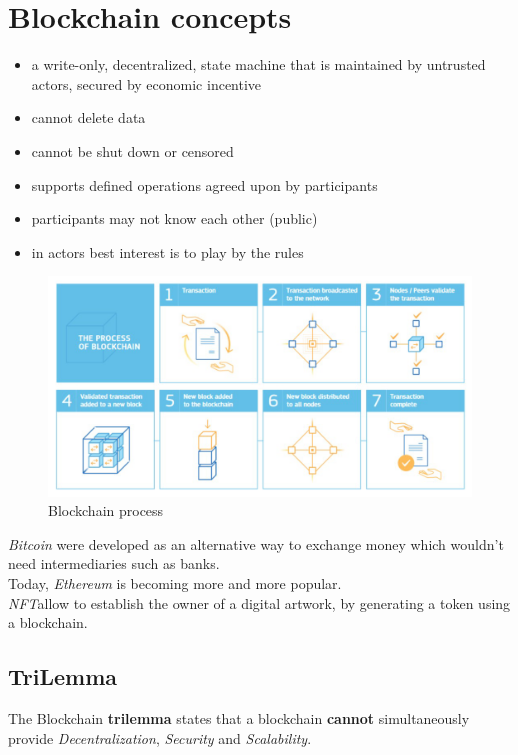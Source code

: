 \section{Blockchain concepts}
\begin{definition}[Blockchain]
\begin{itemize}
   \item a write-only, decentralized, state machine that is maintained by untrusted
   actors, secured by economic incentive
   \item cannot delete data
   \item cannot be shut down or censored
   \item supports defined operations agreed upon by participants
   \item participants may not know each other (public)
   \item in actors best interest is to play by the rules
\end{itemize}
\end{definition}
\begin{figure}[htbp]
   \centering
   \includegraphics{images/blockchain_process.png}
   \caption{Blockchain process}
   \label{fig:blockchain_process}
\end{figure}

\textit{Bitcoin} were developed as an alternative way to exchange money which wouldn't need intermediaries such as banks.\\
Today, \textit{Ethereum} is becoming more and more popular.\\
\textit{NFT}\footnotemark allow to establish the owner of a digital artwork, by generating a token using a blockchain.

\subsection{TriLemma}
The Blockchain \textbf{trilemma} states that a blockchain \textbf{cannot} simultaneously provide \textit{Decentralization}, \textit{Security} and \textit{Scalability}.

